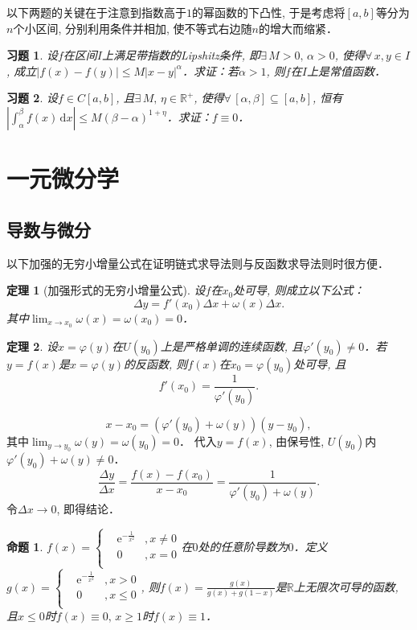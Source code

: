 \documentclass[11pt,a4paper]{ctexart}
\makeatletter
\theoremstyle{thmseries} %
\newtheorem{thm}{定理}[section]
\newtheorem{prop}{命题}[section]
\theoremstyle{exerseries}
\newtheorem{exer}{习题}[section]
\renewenvironment{proof}[1][\proofname]{\par
  \pushQED{\qed}%
  \normalfont \topsep6\p@\@plus6\p@\relax
  \trivlist
  \item[\hskip\labelsep
        \itshape
    #1\@addpunct{}]\ignorespaces
}{%
  \popQED\endtrivlist\@endpefalse
}
\newenvironment{pf}{\begin{proof}[\bfseries\upshape 证\quad]}{\end{proof}}
\newcommand{\bra}[1]{\mathopen{}\left(#1\right)}
\renewcommand{\phi}{\varphi}
\newcommand{\R}{\mathbb{R}}
\renewcommand{\d}{\mathrm{d}}
\newcommand{\e}{\mathrm{e}}
\makeatother
\begin{document}
以下两题的关键在于注意到指数高于$1$的幂函数的下凸性, 于是考虑将$[a,b]$等分为$n$个小区间, 分别利用条件并相加, 使不等式右边随$n$的增大而缩紧．
\begin{exer}
	设$f$在区间$I$上满足带指数的Lipshitz条件, 即$\exists\,M>0,\,\alpha>0$, 使得$\forall\,x,y\in I$, 成立$|f(x)-f(y)|\leq M|x-y|^\alpha$．求证：若$\alpha>1$, 则$f$在$I$上是常值函数．
\end{exer}

\begin{exer}
	设$f\in C[a,b]$, 且$\exists\,M,\,\eta\in\R^+$, 使得$\forall\,[\alpha,\beta]\subseteq[a,b]$, 恒有$\left|\int_{\alpha}^{\beta}f(x)\,\d x\right|\leq M(\beta-\alpha)^{1+\eta}$．求证：$f\equiv0$．
\end{exer}


\section{一元微分学}
\subsection{导数与微分}
以下加强的无穷小增量公式在证明链式求导法则与反函数求导法则时很方便．
\begin{thm}[加强形式的无穷小增量公式]
	设$f$在$x_0$处可导, 则成立以下公式：
	\[\Delta y=f'(x_0)\Delta x+\omega(x)\Delta x.\]
	其中$\lim_{x\to x_0}\omega(x)=\omega(x_0)=0$．
\end{thm}

\begin{thm}
	设$x=\phi(y)$在$U(y_0)$上是严格单调的连续函数, 且$\phi'(y_0)\neq0$．若$y=f(x)$是$x=\phi(y)$的反函数, 则$f(x)$在$x_0=\phi(y_0)$处可导, 且
	\[f'(x_0)=\frac{1}{\phi'(y_0)}.\]
\end{thm}
\begin{pf}
	\[x-x_0=\bra{\phi'(y_0)+\omega(y)}(y-y_0),\]
	其中$\lim_{y\to y_0}\omega(y)=\omega(y_0)=0$．
	代入$y=f(x)$, 由保号性, $U(y_0)$内$\phi'(y_0)+\omega(y)\neq0$．
	\[\frac{\Delta y}{\Delta x}=\frac{f(x)-f(x_0)}{x-x_0}=\frac{1}{\phi'(y_0)+\omega(y)}.\]
	令$\Delta x\to0$, 即得结论．
\end{pf}

\begin{prop}
	$f(x)=\left\{\begin{aligned}
		&\e^{-\frac{1}{x^2}}&,x\neq0\\
		&0&,x=0\\
	\end{aligned}\right.$在$0$处的任意阶导数为$0$．定义$g(x)=\left\{\begin{aligned}
		&\e^{-\frac{1}{x^2}}&,x>0\\
		&0&,x\leq0\\
	\end{aligned}\right.$, 则$f(x)=\frac{g(x)}{g(x)+g(1-x)}$是$\R$上无限次可导的函数, 且$x\leq0$时$f(x)\equiv0,\,x\geq1$时$f(x)\equiv1$．
\end{prop}
\end{document}
